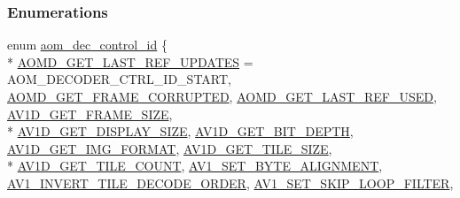 \subsubsection*{Enumerations}
\begin{DoxyCompactItemize}
\item 
enum \hyperlink{group__aom__decoder_ga3865fd4b3192489baa9a5c3632ebe97b}{aom\+\_\+dec\+\_\+control\+\_\+id} \{ \\*
\hyperlink{group__aom__decoder_gga3865fd4b3192489baa9a5c3632ebe97babab96509cdce01ed1cf027185da4d874}{A\+O\+M\+D\+\_\+\+G\+E\+T\+\_\+\+L\+A\+S\+T\+\_\+\+R\+E\+F\+\_\+\+U\+P\+D\+A\+T\+ES} = A\+O\+M\+\_\+\+D\+E\+C\+O\+D\+E\+R\+\_\+\+C\+T\+R\+L\+\_\+\+I\+D\+\_\+\+S\+T\+A\+RT, 
\hyperlink{group__aom__decoder_gga3865fd4b3192489baa9a5c3632ebe97ba159ddb748cb69956226b7c13e3890ff6}{A\+O\+M\+D\+\_\+\+G\+E\+T\+\_\+\+F\+R\+A\+M\+E\+\_\+\+C\+O\+R\+R\+U\+P\+T\+ED}, 
\hyperlink{group__aom__decoder_gga3865fd4b3192489baa9a5c3632ebe97ba03f15fd9a3044ca1a1707e12b6a4588b}{A\+O\+M\+D\+\_\+\+G\+E\+T\+\_\+\+L\+A\+S\+T\+\_\+\+R\+E\+F\+\_\+\+U\+S\+ED}, 
\hyperlink{group__aom__decoder_gga3865fd4b3192489baa9a5c3632ebe97ba175c454a7adf2d3927a0e979b4a2b07b}{A\+V1\+D\+\_\+\+G\+E\+T\+\_\+\+F\+R\+A\+M\+E\+\_\+\+S\+I\+ZE}, 
\\*
\hyperlink{group__aom__decoder_gga3865fd4b3192489baa9a5c3632ebe97ba592a5d1390204d743ddfe7bfe8ef177c}{A\+V1\+D\+\_\+\+G\+E\+T\+\_\+\+D\+I\+S\+P\+L\+A\+Y\+\_\+\+S\+I\+ZE}, 
\hyperlink{group__aom__decoder_gga3865fd4b3192489baa9a5c3632ebe97bace55b4f6d152f2f0d29f70ab918cba4f}{A\+V1\+D\+\_\+\+G\+E\+T\+\_\+\+B\+I\+T\+\_\+\+D\+E\+P\+TH}, 
\hyperlink{group__aom__decoder_gga3865fd4b3192489baa9a5c3632ebe97bacd7229e5fb766670fe995739931c2ee3}{A\+V1\+D\+\_\+\+G\+E\+T\+\_\+\+I\+M\+G\+\_\+\+F\+O\+R\+M\+AT}, 
\hyperlink{group__aom__decoder_gga3865fd4b3192489baa9a5c3632ebe97ba4d9799d9e520785870b8d1f73a19c3c4}{A\+V1\+D\+\_\+\+G\+E\+T\+\_\+\+T\+I\+L\+E\+\_\+\+S\+I\+ZE}, 
\\*
\hyperlink{group__aom__decoder_gga3865fd4b3192489baa9a5c3632ebe97ba242d7dba47ef646f51f9795e2fa92f91}{A\+V1\+D\+\_\+\+G\+E\+T\+\_\+\+T\+I\+L\+E\+\_\+\+C\+O\+U\+NT}, 
\hyperlink{group__aom__decoder_gga3865fd4b3192489baa9a5c3632ebe97babb0f1c97c6092ebed96ca9800e05157e}{A\+V1\+\_\+\+S\+E\+T\+\_\+\+B\+Y\+T\+E\+\_\+\+A\+L\+I\+G\+N\+M\+E\+NT}, 
\hyperlink{group__aom__decoder_gga3865fd4b3192489baa9a5c3632ebe97bac19ffcb187b1e1b5eee18499a97f69d2}{A\+V1\+\_\+\+I\+N\+V\+E\+R\+T\+\_\+\+T\+I\+L\+E\+\_\+\+D\+E\+C\+O\+D\+E\+\_\+\+O\+R\+D\+ER}, 
\hyperlink{group__aom__decoder_gga3865fd4b3192489baa9a5c3632ebe97ba45b658bd6518cfd30c56b13e98ab168a}{A\+V1\+\_\+\+S\+E\+T\+\_\+\+S\+K\+I\+P\+\_\+\+L\+O\+O\+P\+\_\+\+F\+I\+L\+T\+ER}, 

\end{DoxyCompactItemize}
